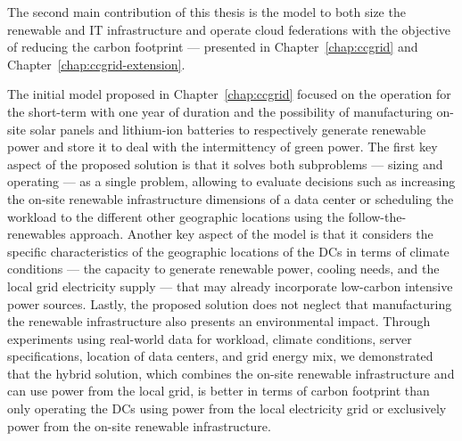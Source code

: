 The second main contribution of this thesis is the model to both size the renewable and IT infrastructure and operate cloud federations with the objective of reducing the carbon footprint --- presented in Chapter~\ref{chap:ccgrid} and Chapter~\ref{chap:ccgrid-extension}. 

The initial model proposed in Chapter~\ref{chap:ccgrid} focused on the operation for the short-term with one year of duration and the possibility of manufacturing on-site solar panels and lithium-ion batteries to respectively generate renewable power and store it to deal with the intermittency of green power. The first key aspect of the proposed solution is that it solves both subproblems --- sizing and operating --- as a single problem, allowing to evaluate decisions such as increasing the on-site renewable infrastructure dimensions of a data center or scheduling the workload to the different other geographic locations using the follow-the-renewables approach. Another key aspect of the model is that it considers the specific characteristics of the geographic locations of the DCs in terms of climate conditions --- the capacity to generate renewable power, cooling needs, and the local grid electricity supply --- that may already incorporate low-carbon intensive power sources. Lastly, the proposed solution does not neglect that manufacturing the renewable infrastructure also presents an environmental impact. Through experiments using real-world data for workload, climate conditions, server specifications, location of data centers, and grid energy mix,  we demonstrated that the hybrid solution, which combines the on-site renewable infrastructure and can use power from the local grid, is better in terms of carbon footprint than only operating the DCs using power from the local electricity grid or exclusively power from the on-site renewable infrastructure.

